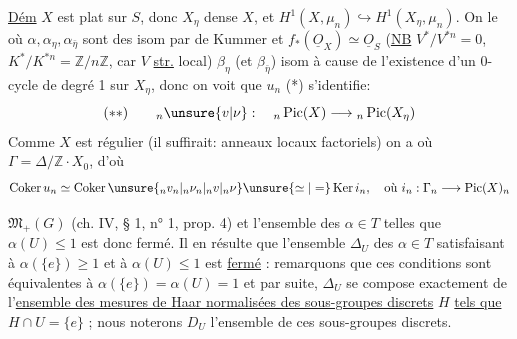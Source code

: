 \uline{Dém} $X$ est plat sur $S$, donc $X_\eta$ dense  $X$, et $H^1(X,\mu_n)\hookrightarrow H^1(X_\eta,\mu_n)$. On  le 
où $\alpha,\alpha_\eta,\alpha_{\bar\eta}$ sont des isom par  de Kummer et $f_*(\underline O_X)\simeq\underline O_S$ (\uline{NB} $V^*/V^{*n}=0$, $K^*/K^{*n}=\mathbb Z/n\mathbb Z$, car $V$ \uline{str.} local) $\beta_\eta$ (et $\beta_{\bar\eta}$)  isom à cause de l'existence d'un 0-cycle de degré 1 sur $X_\eta$, donc on voit que $u_n$  (*) s'identifie:
\[
(**)\qquad{}_n\unsure{v|\nu}:\quad{}_n\operatorname{Pic}(X)\longrightarrow{}_n\operatorname{Pic}(X_\eta)
\]
Comme $X$ est régulier (il suffirait: anneaux locaux factoriels) on a
où $\Gamma=\Delta/\mathbb Z\cdot X_0$, d'où
\[
\operatorname{Coker}u_n\simeq\operatorname{Coker}\unsure{{}_nv_n|{}_n\nu_n|{}_nv|{}_n\nu}\unsure{\simeq|=}\operatorname{Ker}i_n,\quad\text{où }i_n:\Gamma_n\longrightarrow\operatorname{Pic}(X)_n
\]


$\mathfrak M_+(G)$ (ch. IV, § 1, n° 1, prop. 4) et l'ensemble des $\alpha\in T$ telles que $\alpha(U)\leq 1$ est donc fermé. Il en résulte que l'ensemble $\Delta_U$ des $\alpha\in T$ satisfaisant à $\alpha(\{e\})\geq 1$ et à $\alpha(U)\leq 1$ est \uline{fermé} : remarquons que ces conditions sont équivalentes à $\alpha(\{e\})=\alpha(U)=1$ et par suite, $\Delta_U$ se compose exactement de l'\uline{ensemble des mesures de Haar normalisées des sous-groupes discrets} $H$ \uline{tels que} $H\cap U=\{e\}$ ; nous noterons $D_U$ l'ensemble de ces sous-groupes discrets.

